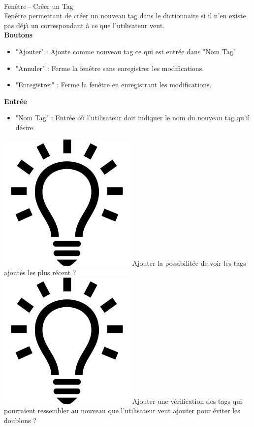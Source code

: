 \documentclass[11pt,french,a4paper]{report}
\begin{document}
\begin{multicols}{2}
\begin{small}
\columnbreak

\dotfill \\

\Large Fenêtre - Créer un Tag\normalsize \\
    Fenêtre permettant de créer un nouveau tag dans le dictionnaire si il n'en existe pas déjà
    un correspondant à ce que l'utilisateur veut. \\
\large \textbf{Boutons}\normalsize
    \begin{itemize}[label=, leftmargin=*,parsep=0cm,itemsep=0cm,topsep=0cm]
        \item "Ajouter" : Ajoute comme nouveau tag ce qui est entrée dans "Nom Tag"
        \item "Annuler" : Ferme la fenêtre sans enregistrer les modifications.
        \item "Enregistrer" : Ferme la fenêtre en enregistrant les modifications.
    \end{itemize}
\large \textbf{Entrée}\normalsize
    \begin{itemize}[label=, leftmargin=*,parsep=0cm,itemsep=0cm,topsep=0cm]
        \item "Nom Tag" : Entrée où l'utilisateur doit indiquer le nom du nouveau tag qu'il désire.
    \end{itemize}
    \includegraphics[scale=0.05]{../images/logo/logo_ampoule} Ajouter la possibilitée de voir les tags ajoutés 
            les plus récent ? \\ 
    \includegraphics[scale=0.05]{../images/logo/logo_ampoule} Ajouter une vérification des tags qui pourraient 
    ressembler au nouveau que l'utilisateur veut ajouter pour éviter les doublons ? \\



\end{small}
\end{multicols}
\end{document}
